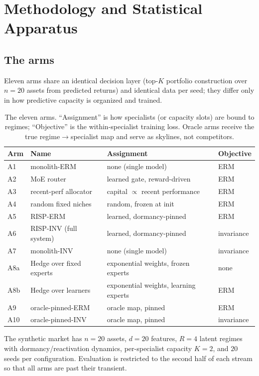 \documentclass[11pt,a4paper]{article}
\theoremstyle{definition}
\theoremstyle{plain}
\begin{document}
\section{Methodology and Statistical Apparatus}
\label{sec:dd5-method}

\subsection{The arms}
\label{sec:dd5-arms}

Eleven arms share an identical decision layer (top-$K$ portfolio construction
over $n=20$ assets from predicted returns) and identical data per seed; they
differ only in how predictive capacity is organized and trained.

\begin{table}[h]
\centering
\caption{The eleven arms. ``Assignment'' is how specialists (or capacity
slots) are bound to regimes; ``Objective'' is the within-specialist training
loss. Oracle arms receive the true regime$\to$specialist map and serve as
skylines, not competitors.}
\label{tab:dd5-arms}
\small
\begin{tabular}{llll}
\toprule
Arm & Name & Assignment & Objective \\
\midrule
A1 & monolith-ERM & none (single model) & ERM \\
A2 & MoE router & learned gate, reward-driven & ERM \\
A3 & recent-perf allocator & capital $\propto$ recent performance & ERM \\
A4 & random fixed niches & random, frozen at init & ERM \\
A5 & RISP-ERM & learned, dormancy-pinned & ERM \\
A6 & RISP-INV (full system) & learned, dormancy-pinned & invariance \\
A7 & monolith-INV & none (single model) & invariance \\
A8a & Hedge over fixed experts & exponential weights, frozen experts & none \\
A8b & Hedge over learners & exponential weights, learning experts & ERM \\
A9 & oracle-pinned-ERM & oracle map, pinned & ERM \\
A10 & oracle-pinned-INV & oracle map, pinned & invariance \\
\bottomrule
\end{tabular}
\end{table}

The synthetic market has $n=20$ assets, $d=20$ features, $R=4$ latent regimes
with dormancy/reactivation dynamics, per-specialist capacity $K=2$, and
$20$ seeds per configuration. Evaluation is restricted to the second half of
each stream so that all arms are past their transient.
\end{document}
